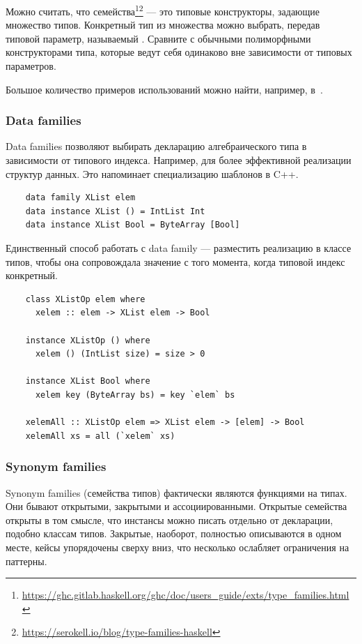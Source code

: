 Можно считать, что семейства\footnote{\url{https://ghc.gitlab.haskell.org/ghc/doc/users_guide/exts/type_families.html}}\footnote{\url{https://serokell.io/blog/type-families-haskell}} --- это типовые конструкторы, задающие множество типов.
Конкретный тип из множества можно выбрать, передав типовой параметр, называемый .
Сравните с обычными полиморфными конструкторами типа, которые ведут себя одинаково вне зависимости от типовых параметров.

Большое количество примеров использований можно найти, например, в~\cite{kiselyov2010fun}.

\subsubsection{Data families}

Data families позволяют выбирать декларацию алгебраического типа в зависимости от типового индекса.
Например, для более эффективной реализации структур данных.
Это напоминает специализацию шаблонов в C++.

\begin{verbatim}
    data family XList elem
    data instance XList () = IntList Int
    data instance XList Bool = ByteArray [Bool]
\end{verbatim}

Единственный способ работать с data family --- разместить реализацию в классе типов, чтобы она сопровождала значение с того момента, когда типовой индекс конкретный.

\begin{verbatim}
    class XListOp elem where
      xelem :: elem -> XList elem -> Bool

    instance XListOp () where
      xelem () (IntList size) = size > 0

    instance XList Bool where
      xelem key (ByteArray bs) = key `elem` bs

    xelemAll :: XListOp elem => XList elem -> [elem] -> Bool
    xelemAll xs = all (`xelem` xs)
\end{verbatim}

\subsubsection{Synonym families}

Synonym families (семейства типов) фактически являются функциями на типах.
Они бывают открытыми, закрытыми и ассоциированными.
Открытые семейства открыты в том смысле, что инстансы можно писать отдельно от декларации, подобно классам типов.
Закрытые, наоборот, полностью описываются в одном месте, кейсы упорядочены сверху вниз, что несколько ослабляет ограничения на паттерны.

